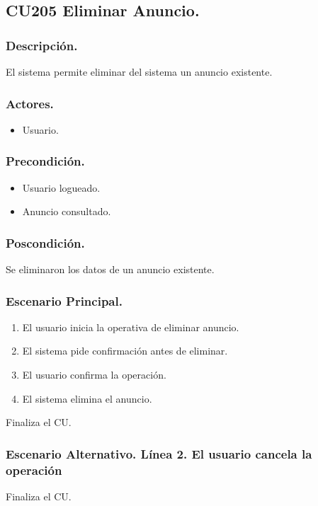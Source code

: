 \subsection{CU205 Eliminar Anuncio.}
\subsubsection{Descripci\'{o}n.}
El sistema permite eliminar del sistema un anuncio existente.
\subsubsection{Actores.}
\begin{itemize}
\item Usuario.
\end{itemize}
\subsubsection{Precondici\'{o}n.}
\begin{itemize}
\item Usuario logueado.
\item Anuncio consultado.
\end{itemize}
\subsubsection{Poscondici\'{o}n.}
Se eliminaron los datos de un anuncio existente.
\subsubsection{Escenario Principal.}
\begin{enumerate}
\item El usuario inicia la operativa de eliminar anuncio.
\item El sistema pide confirmaci\'{o}n antes de eliminar.
\item El usuario confirma la operaci\'{o}n.
\item El sistema elimina el anuncio.
\end{enumerate}
Finaliza el CU.
\subsubsection{Escenario Alternativo. L\'{i}nea 2. El usuario cancela la operaci\'{o}n}
Finaliza el CU.